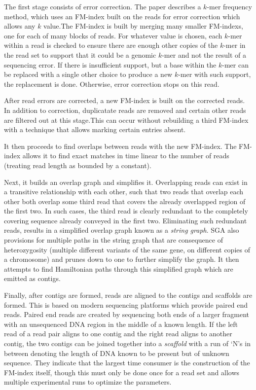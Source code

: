 \documentclass[doctor]{thesis}
\begin{document}
The first stage consists of error correction.  The paper describes a $k$-mer frequency method, which uses an FM-index built on the reads for error correction which allows any $k$ value.The FM-index is built by merging many smaller FM-indexs, one for each of many blocks of reads.
For whatever value is chosen, each $k$-mer within a read is checked to ensure there are enough other copies of the $k$-mer in the read set to support that it could be a genomic $k$-mer and not the result of a sequencing error.
If there is insufficient support, but a base within the $k$-mer can be replaced with a single other choice to produce a new $k$-mer with such support, the replacement is done.
Otherwise, error correction stops on this read.

After read errors are corrected, a new FM-index is built on the corrected reads.
In addition to correction,  duplicatate reads are removed and certain other reads are filtered out at this stage.This can occur without rebuilding a third FM-index with a technique that allows  marking certain entries absent.

It then proceeds to find overlaps between reads with the new FM-index.
The FM-index allows it to find exact matches in time linear to the number of reads (treating read length as bounded by a constant).

Next, it builds an overlap graph and simplifies it.
Overlapping reads can exist in a transitive relationship with each other, such that two reads that overlap each other both overlap some third read that covers the already overlapped region of the first two.
In such cases, the third read is clearly redundant to the completely covering sequence already conveyed in the first two.
Eliminating such redundant reads, results in a simplified overlap graph known as a \emph{string graph}.
SGA also provisions for multiple paths in the string graph that are consequence of heterozygosity (multiple different variants of the same gene, on different copies of a chromosome) and prunes down to one to further simplify the graph.
It then attempts to find Hamiltonian paths through this simplified graph which are emitted as contigs.

Finally, after contigs are formed, reads are aligned to the contigs and scaffolds are formed.
This is based on modern sequencing platforms which provide paired end reads.
Paired end reads are created by sequencing both ends of a larger fragment with an unsequenced DNA region in the middle of a known length.
If the left read of a read pair aligns to one contig and the right read aligns to another contig, the two contigs can be joined together into a \emph{scaffold} with a run of `N's in between denoting the length of DNA known to be present but of unknown sequence.
They indicate that the largest time consumer is the construction of the FM-index itself, though this must only be done once for a read set and allows multiple experimental runs to optimize the parameters.
\end{document}

